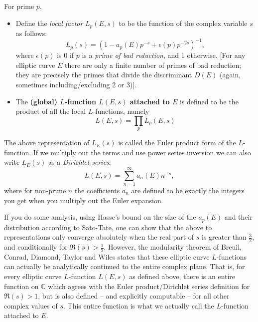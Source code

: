\documentclass[10pt]{article}
\begin{document}
\begin{definition}  For prime $p$,
\begin{itemize}
\item Define the {\it local factor} $L_p(E,s)$ to be the function of the complex variable $s$ as follows:
\begin{equation}
L_p(s) = \left(1-a_p(E)p^{-s} + \epsilon(p)p^{-2s}\right)^{-1},
\end{equation}
where $\epsilon(p)$ is 0 if $p$ is a {\it prime of bad reduction}, and 1 otherwise. [For any elliptic curve $E$ there are only a finite number of primes of bad reduction; they are precisely the primes that divide the discriminant $D(E)$ (again, sometimes including/excluding 2 or 3)].
\item The {\bf (global) $L$-function $L(E,s)$ attached to $E$} is defined to be the product of all the local $L$-functions, namely
\begin{equation}
L(E,s)  = \prod_{p} L_p(E,s)
\end{equation}
\end{itemize}
\end{definition}
The above representation of $L_E(s)$ is called the Euler product form of the $L$-function. If we multiply out the terms and use power series inversion we can also write $L_E(s)$ as a {\it Dirichlet series}:
\begin{equation}
L(E,s) = \sum_{n=1}^{\infty} a_n(E) n^{-s},
\end{equation}
where for non-prime $n$ the coefficients $a_n$ are defined to be exactly the integers you get when you multiply out the Euler expansion.

If you do some analysis, using Hasse's bound on the size of the $a_p(E)$ and their distribution according to Sato-Tate, one can show that the above to representations only converge absolutely when the real part of $s$ is greater than $\frac{3}{2}$, and conditionally for $\Re(s)>\frac{1}{2}$. However, the modularity theorem of Breuil, Conrad, Diamond, Taylor and Wiles \cite{BCDT-2011} \cite{TaWi-1995} \cite{Wil-1995} states that these elliptic curve $L$-functions can actually be analytically continued to the entire complex plane. That is, for every elliptic curve $L$-function $L(E,s)$ as defined above, there is an entire function on $\mathbb{C}$ which agrees with the Euler product/Dirichlet series definition for $\Re(s)>1$, but is also defined -- and explicitly computable -- for all other complex values of $s$. This entire function is what we actually call the $L$-function attached to $E$.
\end{document}
